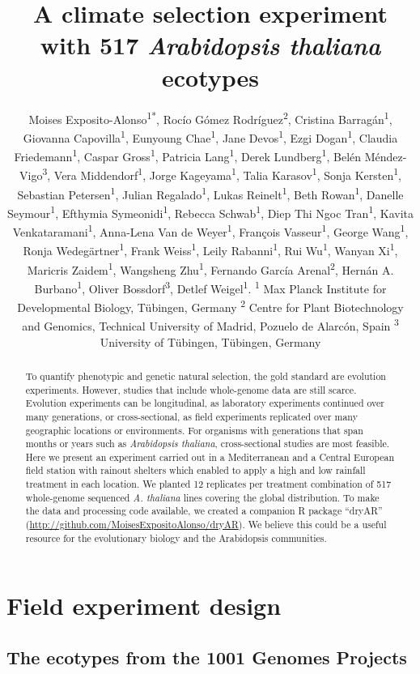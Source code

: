 \documentclass[12pt,]{article}
\title{A climate selection experiment with 517 \emph{Arabidopsis thaliana}
ecotypes}
\author{\newline \normalfont Moises
Exposito-Alonso\textsuperscript{1}\textsuperscript{*}, Rocío Gómez
Rodríguez\textsuperscript{2}, Cristina Barragán\textsuperscript{1},
Giovanna Capovilla\textsuperscript{1}, Eunyoung Chae\textsuperscript{1},
Jane Devos\textsuperscript{1}, Ezgi Dogan\textsuperscript{1}, Claudia
Friedemann\textsuperscript{1}, Caspar Gross\textsuperscript{1}, Patricia
Lang\textsuperscript{1}, Derek Lundberg\textsuperscript{1}, Belén
Méndez-Vigo\textsuperscript{3}, Vera Middendorf\textsuperscript{1},
Jorge Kageyama\textsuperscript{1}, Talia Karasov\textsuperscript{1},
Sonja Kersten\textsuperscript{1}, Sebastian Petersen\textsuperscript{1},
Julian Regalado\textsuperscript{1}, Lukas Reinelt\textsuperscript{1},
Beth Rowan\textsuperscript{1}, Danelle Seymour\textsuperscript{1},
Efthymia Symeonidi\textsuperscript{1}, Rebecca
Schwab\textsuperscript{1}, Diep Thi Ngoc Tran\textsuperscript{1}, Kavita
Venkataramani\textsuperscript{1}, Anna-Lena Van de
Weyer\textsuperscript{1}, François Vasseur\textsuperscript{1}, George
Wang\textsuperscript{1}, Ronja Wedegärtner\textsuperscript{1}, Frank
Weiss\textsuperscript{1}, Leily Rabanni\textsuperscript{1}, Rui
Wu\textsuperscript{1}, Wanyan Xi\textsuperscript{1}, Maricris
Zaidem\textsuperscript{1}, Wangsheng Zhu\textsuperscript{1}, Fernando
García Arenal\textsuperscript{2}, Hernán A. Burbano\textsuperscript{1},
Oliver Bossdorf\textsuperscript{3}, Detlef Weigel\textsuperscript{1}.
\newline \small \newline \textsuperscript{1} Max Planck Institute for
Developmental Biology, Tübingen, Germany \newline \textsuperscript{2}
Centre for Plant Biotechnology and Genomics, Technical University of
Madrid, Pozuelo de Alarcón, Spain \newline \textsuperscript{3}
University of Tübingen, Tübingen, Germany \newline 
\newline \newline \newline \newline \newline \newline \newline \newline}
\date{}
\begin{document}
\maketitle
\begin{abstract}
To quantify phenotypic and genetic natural selection, the gold standard
are evolution experiments. However, studies that include whole-genome
data are still scarce. Evolution experiments can be longitudinal, as
laboratory experiments continued over many generations, or
cross-sectional, as field experiments replicated over many geographic
locations or environments. For organisms with generations that span
months or years such as \textit{Arabidopsis thaliana}, cross-sectional
studies are most feasible. Here we present an experiment carried out in
a Mediterranean and a Central European field station with rainout
shelters which enabled to apply a high and low rainfall treatment in
each location. We planted 12 replicates per treatment combination of 517
whole-genome sequenced \textit{A. thaliana} lines covering the global
distribution. To make the data and processing code available, we created
a companion R package ``dryAR''
(\url{http://github.com/MoisesExpositoAlonso/dryAR}). We believe this
could be a useful resource for the evolutionary biology and the
Arabidopsis communities.
\end{abstract}

\section{Field experiment design}\label{field-experiment-design}

\subsection{The ecotypes from the 1001 Genomes
Projects}\label{the-ecotypes-from-the-1001-genomes-projects}
\end{document}

